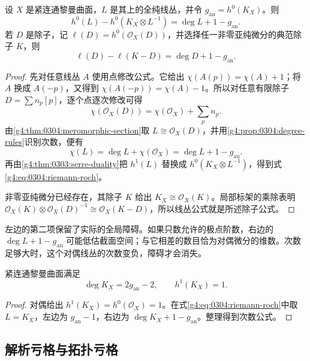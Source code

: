 \begin{theorem}
	\label{g4:thm:0304:riemann-roch}
	设 \(X\) 是紧连通黎曼曲面，\(L\) 是其上的全纯线丛，并令 \(g_{\mathrm{an}}=h^0(K_X)\)。则
	\begin{equation}
		\label{g4:eq:0304:riemann-roch}
		h^0(L)-h^0(K_X\otimes L^{-1})
		=\deg L+1-g_{\mathrm{an}}.
	\end{equation}
	若 \(D\) 是除子，记 \(\ell(D)=h^0(\mathcal O_X(D))\)，并选择任一非零亚纯微分的典范除子 \(K\)，则
	\[
		\ell(D)-\ell(K-D)=\deg D+1-g_{\mathrm{an}}.
	\]
\end{theorem}
\begin{proof}
	先对任意线丛 \(A\) 使用点修改公式。它给出 \(\chi(A(p))=\chi(A)+1\)；将 \(A\) 换成 \(A(-p)\)，又得到 \(\chi(A(-p))=\chi(A)-1\)。所以对任意有限除子 \(D=\sum n_p[p]\)，逐个点逐次修改可得
	\[
		\chi(\mathcal O_X(D))=\chi(\mathcal O_X)+\sum_p n_p.
	\]
	由\cref{g4:thm:0304:meromorphic-section}取 \(L\cong\mathcal O_X(D)\)，并用\cref{g4:prop:0304:degree-rules}识别次数，便有
	\[
		\chi(L)=\deg L+\chi(\mathcal O_X)=\deg L+1-g_{\mathrm{an}}.
	\]
	再由\cref{g4:thm:0303:serre-duality}把 \(h^1(L)\) 替换成 \(h^0(K_X\otimes L^{-1})\)，得到式\eqref{g4:eq:0304:riemann-roch}。

	非零亚纯微分已经存在，其除子 \(K\) 给出 \(K_X\cong\mathcal O_X(K)\)。局部标架的乘除表明 \(\mathcal O_X(K)\otimes\mathcal O_X(D)^{-1}\cong\mathcal O_X(K-D)\)，所以线丛公式就是所述除子公式。
\end{proof}

左边的第二项保留了实际的全局障碍。如果只数允许的极点阶数，右边的 \(\deg L+1-g_{\mathrm{an}}\) 可能低估截面空间；与它相差的数目恰为对偶微分的维数。次数足够大时，这个对偶线丛的次数变负，障碍才会消失。

\begin{corollary}
	\label{g4:cor:0304:canonical-degree}
	紧连通黎曼曲面满足
	\[
		\deg K_X=2g_{\mathrm{an}}-2,\qquad h^1(K_X)=1.
	\]
\end{corollary}
\begin{proof}
	对偶给出 \(h^1(K_X)=h^0(\mathcal O_X)=1\)。在式\eqref{g4:eq:0304:riemann-roch}中取 \(L=K_X\)，左边为 \(g_{\mathrm{an}}-1\)，右边为 \(\deg K_X+1-g_{\mathrm{an}}\)。整理得到次数公式。
\end{proof}

\subsection{解析亏格与拓扑亏格}
\label{g4:subsec:0304:05}

